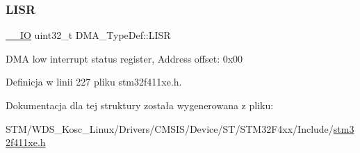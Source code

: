 \subsubsection{\texorpdfstring{L\+I\+SR}{LISR}}
{\footnotesize\ttfamily \hyperlink{core__sc300_8h_aec43007d9998a0a0e01faede4133d6be}{\+\_\+\+\_\+\+IO} uint32\+\_\+t D\+M\+A\+\_\+\+Type\+Def\+::\+L\+I\+SR}

D\+MA low interrupt status register, Address offset\+: 0x00 

Definicja w linii 227 pliku stm32f411xe.\+h.



Dokumentacja dla tej struktury została wygenerowana z pliku\+:\begin{DoxyCompactItemize}
\item 
S\+T\+M/\+W\+D\+S\+\_\+\+Kosc\+\_\+\+Linux/\+Drivers/\+C\+M\+S\+I\+S/\+Device/\+S\+T/\+S\+T\+M32\+F4xx/\+Include/\hyperlink{stm32f411xe_8h}{stm32f411xe.\+h}\end{DoxyCompactItemize}
